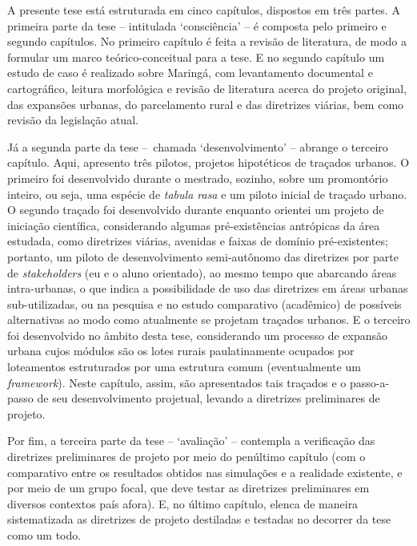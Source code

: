 \documentclass[12pt, a4paper]{book} %
\begin{document}
            A presente tese está estruturada em cinco capítulos, dispostos em três partes. A primeira parte da tese – intitulada `consciência' – é composta pelo primeiro e segundo capítulos. No primeiro capítulo é feita a revisão de literatura, de modo a formular um marco teórico-conceitual para a tese. E no segundo capítulo um estudo de caso é realizado sobre Maringá, com levantamento documental e cartográfico, leitura morfológica e revisão de literatura acerca do projeto original, das expansões urbanas, do parcelamento rural e das diretrizes viárias, bem como revisão da legislação atual.

            Já a segunda parte da tese – chamada `desenvolvimento' – abrange o terceiro capítulo. Aqui, apresento três pilotos, projetos hipotéticos de traçados urbanos. O primeiro foi desenvolvido durante o mestrado, sozinho, sobre um promontório inteiro, ou seja, uma espécie de \textit{tabula rasa} e um piloto inicial de traçado urbano. O segundo traçado foi desenvolvido durante enquanto orientei um projeto de iniciação científica, considerando algumas pré-existências antrópicas da área estudada, como diretrizes viárias, avenidas e faixas de domínio pré-existentes; portanto, um piloto de desenvolvimento semi-autônomo das diretrizes por parte de \textit{stakeholders} (eu e o aluno orientado), ao mesmo tempo que abarcando áreas intra-urbanas, o que indica a possibilidade de uso das diretrizes em áreas urbanas sub-utilizadas, ou na pesquisa e no estudo comparativo (acadêmico) de possíveis alternativas ao modo como atualmente se projetam traçados urbanos. E o terceiro foi desenvolvido no âmbito desta tese, considerando um processo de expansão urbana cujos módulos são os lotes rurais paulatinamente ocupados por loteamentos estruturados por uma estrutura comum (eventualmente um \textit{framework}). Neste capítulo, assim, são apresentados tais traçados e o passo-a-passo de seu desenvolvimento projetual, levando a diretrizes preliminares de projeto.

            Por fim, a terceira parte da tese – `avaliação' – contempla a verificação das diretrizes preliminares de projeto por meio do penúltimo capítulo (com o comparativo entre os resultados obtidos nas simulações e a realidade existente, e por meio de um grupo focal, que deve testar as diretrizes preliminares em diversos contextos país afora). E, no último capítulo, elenca de maneira sistematizada as diretrizes de projeto destiladas e testadas no decorrer da tese como um todo.
\end{document}
